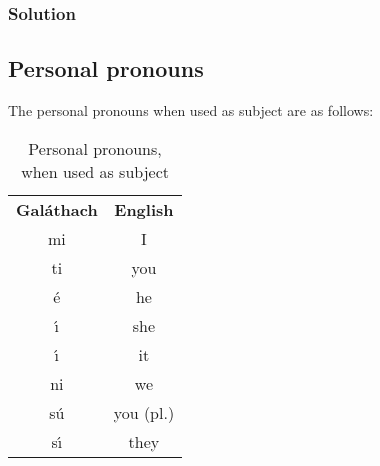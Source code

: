 \subsubsection{Solution}
\begin{table}[H]
\centering
{}
\label{solution_present_tense}
\caption{Solution: present tense}
\end{table}
\newpage

\subsection{Personal pronouns}

The personal pronouns when used as subject are as follows:
\begin{table}[H]
\centering
\begin{tabular}{cc}
  \toprule
  \textbf{Gal\'{a}thach} & \textbf{English}\\
  \cmidrule(lr){1-1}\cmidrule{2-2}
  mi & I \\
  ti & you\\
  \'{e} & he\\
  \'{\i} & she\\
  \'{\i} & it\\
  ni & we\\
  s\'{u} & you (pl.)\\
  s\'{\i} & they\\
  \bottomrule
\end{tabular}
\caption{Personal pronouns, when used as subject}
\label{personal_pronouns_as_subject}
\end{table}

